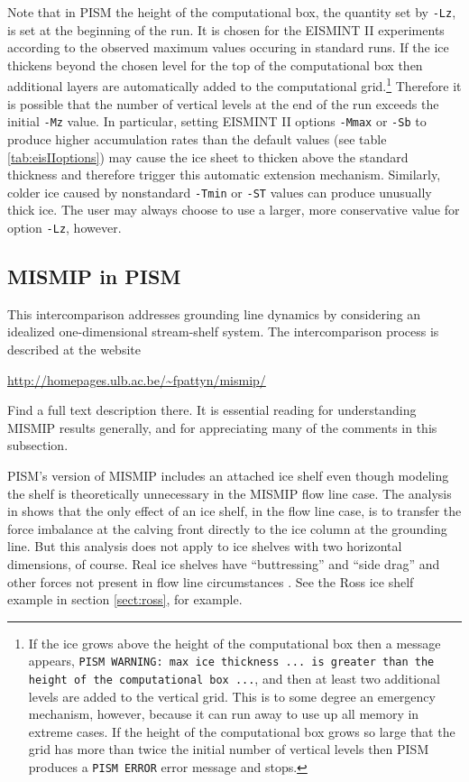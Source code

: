 \documentclass[11pt,final]{amsart}
\begin{document}
Note that in PISM the height of the computational box, the quantity set by \verb|-Lz|, is set at the beginning of the run.  It is chosen for the EISMINT II experiments according to the observed maximum values occuring in standard runs.  If the ice thickens beyond the chosen level for the top of the computational box then additional layers are automatically added to the computational grid.\footnote{If the ice grows above the height of the computational box then a message appears, \texttt{PISM WARNING: max ice thickness ... is greater than the height of the computational box ...}, and then at least two additional levels are added to the vertical grid.  This is to some degree an emergency mechanism, however, because it can run away to use up all memory in extreme cases.  If the height of the computational box grows so large that the grid has more than twice the initial number of vertical levels then PISM produces a \texttt{PISM ERROR} error message and stops.}   Therefore it is possible that the number of vertical levels at the end of the run exceeds the initial \verb|-Mz| value.  In particular, setting EISMINT II options \verb|-Mmax| or \verb|-Sb| to produce higher accumulation rates than the default values (see table \ref{tab:eisIIoptions}) may cause the ice sheet to thicken above the standard thickness and therefore trigger this automatic extension mechanism.  Similarly, colder ice caused by nonstandard \verb|-Tmin| or \verb|-ST| values can produce unusually thick ice.  The user may always choose to use a larger, more conservative value for option \verb|-Lz|, however.

\subsection{MISMIP in PISM}\label{subsect:MISMIP}  This intercomparison addresses grounding line dynamics by considering an idealized one-dimensional stream-shelf system.  The intercomparison process is described at the website

\centerline{\url{http://homepages.ulb.ac.be/~fpattyn/mismip/}}

\noindent Find a full text description there.  It is essential reading for understanding MISMIP results generally, and for appreciating many of the comments in this subsection.

PISM's version of MISMIP includes an attached ice shelf even though modeling the shelf is theoretically unnecessary in the MISMIP flow line case.  The analysis in \cite{SchoofMarine1} shows that the only effect of an ice shelf, in the flow line case, is to transfer the force imbalance at the calving front directly to the ice column at the grounding line.  But this analysis does not apply to ice shelves with two horizontal dimensions, of course.  Real ice shelves have ``buttressing'' and ``side drag'' and other forces not present in flow line circumstances \cite{Goldbergetal2009}.  See the Ross ice shelf example in section \ref{sect:ross}, for example.
\end{document}
